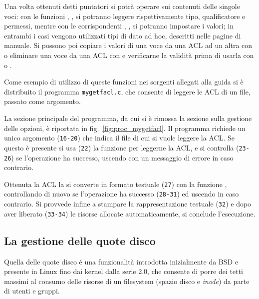 Una volta ottenuti detti puntatori si potrà operare sui contenuti delle
singole voci: con le funzioni ,
,  si potranno leggere
rispettivamente tipo, qualificatore e permessi, mentre con le corrispondenti
, ,
 si potranno impostare i valori; in entrambi i casi
vengono utilizzati tipi di dato ad hoc, descritti nelle pagine di manuale. Si
possono poi copiare i valori di una voce da una ACL ad un altra con
 o eliminare una voce da una ACL con
 e verificarne la validità prima di usarla con
 o .


Come esempio di utilizzo di queste funzioni nei sorgenti allegati alla guida
si è distribuito il programma \texttt{mygetfacl.c}, che consente di leggere le
ACL di un file, passato come argomento.

La sezione principale del programma, da cui si è rimossa la sezione sulla
gestione delle opzioni, è riportata in fig.~\ref{fig:proc_mygetfacl}. Il
programma richiede un unico argomento (\texttt{\small 16-20}) che indica il
file di cui si vuole leggere la ACL. Se questo è presente si usa
(\texttt{\small 22}) la funzione  per leggerne la ACL, e
si controlla (\texttt{\small 23-26}) se l'operazione ha successo, uscendo con
un messaggio di errore in caso contrario. 

Ottenuta la ACL la si converte in formato testuale (\texttt{\small 27}) con la
funzione , controllando di nuovo se l'operazione ha
successo (\texttt{\small 28-31}) ed uscendo in caso contrario.  Si provvede
infine a stampare la rappresentazione testuale (\texttt{\small 32}) e dopo
aver liberato (\texttt{\small 33-34}) le risorse allocate automaticamente, si
conclude l'esecuzione.


\subsection{La gestione delle quote disco}
\label{sec:disk_quota}

Quella delle quote disco è una funzionalità introdotta inizialmente da BSD e
presente in Linux fino dai kernel dalla serie 2.0, che consente di porre dei
tetti massimi al consumo delle risorse di un filesystem (spazio disco e
\textit{inode}) da parte di utenti e gruppi.

